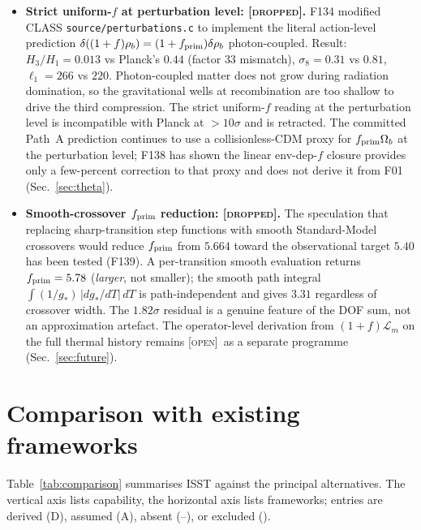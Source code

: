 \documentclass[aps,prd,twocolumn,nofootinbib,floatfix,superscriptaddress]{revtex4-2}
\newcommand{\OPEN}{{\color{black!60!red}\textsc{[open]}}}
\newcommand{\DROPPED}{{\color{red!70!black}\textsc{[dropped]}}}
\newcommand{\Lm}{\mathcal{L}_m}
\newcommand{\fprim}{f_{\rm prim}}
\begin{document}
\begin{itemize}
dismissed as ``not derivationally justified,'' is independently
confirmed by both Boltzmann integrators (Sec.~\ref{sec:theta}). The
Branch-A radiation closure $\Pi_{\rm rad} = -\rho_r/2$ that F95
derived for the BBN and recombination arguments is independent of
the retracted analytical recipe and remains load-bearing.
\item \textbf{Strict uniform-$f$ at perturbation level: \DROPPED.}
F134 modified CLASS \texttt{source/perturbations.c} to implement
the literal action-level prediction $\delta((1+f)\rho_b) =
(1+\fprim)\delta\rho_b$ photon-coupled. Result:
$H_3/H_1 = 0.013$ vs Planck's $0.44$ (factor $33$ mismatch),
$\sigma_8 = 0.31$ vs $0.81$, $\ell_1 = 266$ vs $220$. Photon-coupled
matter does not grow during radiation domination, so the
gravitational wells at recombination are too shallow to drive the
third compression. The strict uniform-$f$ reading at the
perturbation level is incompatible with Planck at $>10\sigma$ and
is retracted. The committed Path~A prediction continues to use a
collisionless-CDM proxy for $\fprim\Omega_b$ at the perturbation
level; F138 has shown the linear env-dep-$f$ closure provides only
a few-percent correction to that proxy and does not derive it from
F01 (Sec.~\ref{sec:theta}).

\item \textbf{Smooth-crossover $\fprim$ reduction: \DROPPED.}
The speculation that replacing sharp-transition step functions with
smooth Standard-Model crossovers would reduce $\fprim$ from $5.664$
toward the observational target $5.40$ has been tested (F139). A
per-transition smooth evaluation returns $\fprim = 5.78$
(\emph{larger}, not smaller); the smooth path integral
$\int (1/g_*)\,|dg_*/dT|\,dT$ is path-independent and gives $3.31$
regardless of crossover width. The $1.82\sigma$ residual is a
genuine feature of the DOF sum, not an approximation artefact. The
operator-level derivation from $(1{+}f)\Lm$ on the full thermal
history remains \OPEN\ as a separate programme
(Sec.~\ref{sec:future}).
\end{itemize}

\section{Comparison with existing frameworks}
\label{sec:comparison}

Table~\ref{tab:comparison} summarises ISST against the principal
alternatives. The vertical axis lists capability, the horizontal
axis lists frameworks; entries are derived (D), assumed (A), absent
(--), or excluded (\texttimes).
\end{document}

